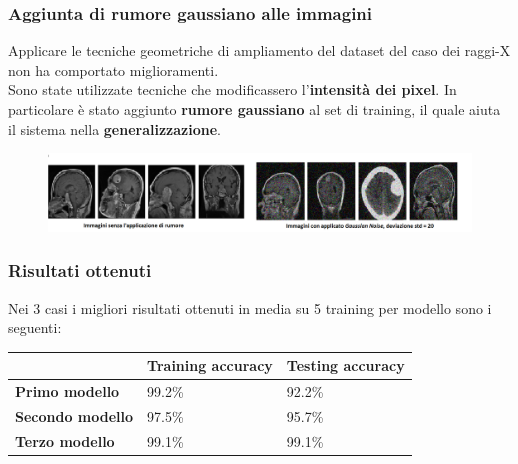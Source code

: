 \documentclass{beamer}
\begin{document}
\begin{frame}
	\frametitle{Aggiunta di rumore gaussiano alle immagini}
	Applicare le tecniche geometriche di ampliamento del dataset del caso dei raggi-X non ha comportato miglioramenti.\\
	Sono state utilizzate tecniche che modificassero l'\textbf{intensità dei pixel}.
	In particolare è stato aggiunto \textbf{rumore gaussiano} al set di training,
	 il quale aiuta il sistema nella \textbf{generalizzazione}. 
	 \begin{figure}
		\includegraphics[width=1\textwidth]{images-noise-var-20.png}
	\end{figure}
	

	 
\end{frame}





\begin{frame}
	\frametitle{Risultati ottenuti}
			Nei 3 casi i migliori risultati ottenuti in media su 5 training per modello sono i seguenti:
			\begin{table}[]
				\begin{tabular}{lll}
													 & \textbf{Training accuracy} & \textbf{Testing accuracy} \\ \hline
				\multicolumn{1}{l|}{\textbf{Primo modello}}   & 99.2\%            & 92.2\%           \\
				\multicolumn{1}{l|}{\textbf{Secondo modello}} & 97.5\%            & 95.7\%           \\
				\multicolumn{1}{l|}{\textbf{Terzo modello}}   & 99.1\%            & 99.1\%          
				\end{tabular}
				\end{table}
	\end{frame}
\end{document}
